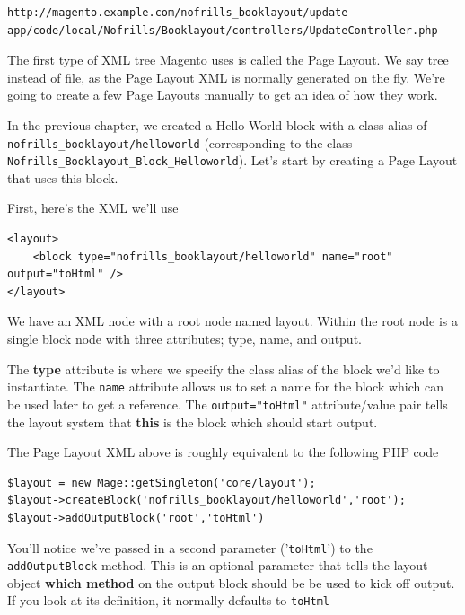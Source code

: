 \documentclass[oneside]{book}
\begin{document}
\begin{lstlisting}
http://magento.example.com/nofrills_booklayout/update
app/code/local/Nofrills/Booklayout/controllers/UpdateController.php

\end{lstlisting}


The first type of XML tree Magento uses is called the Page Layout.  We say tree instead of file, as the Page Layout XML is normally generated on the fly.  We're going to create a few Page Layouts manually to get an idea of how they work.

In the previous chapter, we created a Hello World block with a class alias of \footnotesize\texttt{nofrills\_booklayout/helloworld} \normalsize  (corresponding to the class \footnotesize\texttt{Nofrills\_Booklayout\_Block\_Helloworld}\normalsize).  Let's start by creating a Page Layout that uses this block. 

First, here's the XML we'll use

\begin{lstlisting}
<layout>
    <block type="nofrills_booklayout/helloworld" name="root" output="toHtml" />
</layout>

\end{lstlisting}


We have an XML node with a root node named layout.  Within the root node is a single block node with three attributes; type, name, and output. 

The \textbf{type} attribute is where we specify the class alias of the block we'd like to instantiate.  The \footnotesize\texttt{name} \normalsize  attribute allows us to set a name for the block which can be used later to get a reference.  The \footnotesize\texttt{output="toHtml"} \normalsize  attribute/value pair tells the layout system that \textbf{this} is the block which should start output.

The Page Layout XML above is roughly equivalent to the following PHP code

\begin{lstlisting}
$layout = new Mage::getSingleton('core/layout');
$layout->createBlock('nofrills_booklayout/helloworld','root');
$layout->addOutputBlock('root','toHtml')

\end{lstlisting}


You'll notice we've passed in a second parameter ('\footnotesize\texttt{toHtml}\normalsize') to the \footnotesize\texttt{addOutputBlock} \normalsize  method.  This is an optional parameter that tells the layout object \textbf{which method} on the output block should be be used to kick off output.  If you look at its definition, it normally defaults to \footnotesize\texttt{toHtml} \normalsize 
\end{document}
